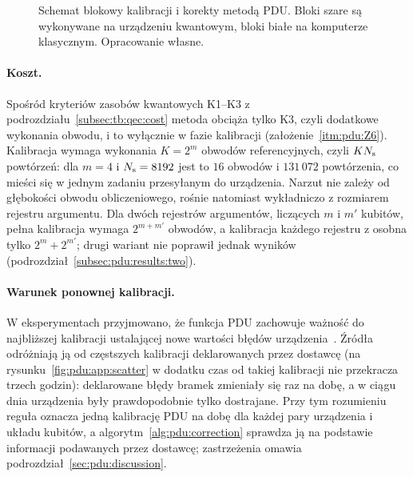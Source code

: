 \begin{figure}[tb]
\centering

\caption[Schemat blokowy kalibracji i korekty metodą PDU]{Schemat blokowy kalibracji i korekty metodą PDU.
Bloki szare są wykonywane na urządzeniu kwantowym, bloki białe na komputerze klasycznym.
Opracowanie własne.}
\label{fig:pdu:flowchart}
\end{figure}

\paragraph{Koszt.}
Spośród kryteriów zasobów kwantowych K1--K3 z podrozdziału~\ref{subsec:tb:qec:cost} metoda obciąża tylko K3, czyli dodatkowe wykonania obwodu, i to wyłącznie w fazie kalibracji (założenie~\ref{itm:pdu:Z6}).
Kalibracja wymaga wykonania $K=2^{m}$ obwodów referencyjnych, czyli $KN_{\mathrm{s}}$ powtórzeń: dla $m=4$ i $N_{\mathrm{s}}=8192$ jest to $16$ obwodów i $131\,072$ powtórzenia, co mieści się w jednym zadaniu przesyłanym do urządzenia.
Narzut nie zależy od głębokości obwodu obliczeniowego, rośnie natomiast wykładniczo z rozmiarem rejestru argumentu.
Dla dwóch rejestrów argumentów, liczących $m$ i $m'$ kubitów, pełna kalibracja wymaga $2^{m+m'}$ obwodów, a kalibracja każdego rejestru z osobna tylko $2^{m}+2^{m'}$; drugi wariant nie poprawił jednak wyników (podrozdział~\ref{subsec:pdu:results:two}).

\paragraph{Warunek ponownej kalibracji.}
W eksperymentach przyjmowano, że funkcja PDU zachowuje ważność do najbliższej kalibracji ustalającej nowe wartości błędów urządzenia~\cite{werner_experiment_driven_2022,werner_magisterka_2022}.
Źródła odróżniają ją od częstszych kalibracji deklarowanych przez dostawcę (na rysunku~\ref{fig:pdu:app:scatter} w dodatku czas od takiej kalibracji nie przekracza trzech godzin): deklarowane błędy bramek zmieniały się raz na dobę, a w ciągu dnia urządzenia były prawdopodobnie tylko dostrajane.
Przy tym rozumieniu reguła oznacza jedną kalibrację PDU na dobę dla każdej pary urządzenia i układu kubitów, a algorytm~\ref{alg:pdu:correction} sprawdza ją na podstawie informacji podawanych przez dostawcę; zastrzeżenia omawia podrozdział~\ref{sec:pdu:discussion}.

